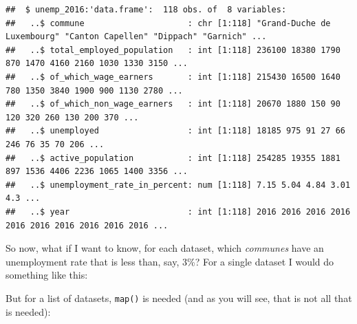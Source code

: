 \documentclass[]{gitbook}
\newenvironment{Shaded}{\begin{snugshade}}{\end{snugshade}}
\newcommand{\DecValTok}[1]{\textcolor[rgb]{0.00,0.00,0.81}{#1}}
\newcommand{\KeywordTok}[1]{\textcolor[rgb]{0.13,0.29,0.53}{\textbf{#1}}}
\newcommand{\NormalTok}[1]{#1}
\newcommand{\OperatorTok}[1]{\textcolor[rgb]{0.81,0.36,0.00}{\textbf{#1}}}
\newcommand{\StringTok}[1]{\textcolor[rgb]{0.31,0.60,0.02}{#1}}
\begin{document}
\begin{verbatim}
##  $ unemp_2016:'data.frame':  118 obs. of  8 variables:
##   ..$ commune                     : chr [1:118] "Grand-Duche de Luxembourg" "Canton Capellen" "Dippach" "Garnich" ...
##   ..$ total_employed_population   : int [1:118] 236100 18380 1790 870 1470 4160 2160 1030 1330 3150 ...
##   ..$ of_which_wage_earners       : int [1:118] 215430 16500 1640 780 1350 3840 1900 900 1130 2780 ...
##   ..$ of_which_non_wage_earners   : int [1:118] 20670 1880 150 90 120 320 260 130 200 370 ...
##   ..$ unemployed                  : int [1:118] 18185 975 91 27 66 246 76 35 70 206 ...
##   ..$ active_population           : int [1:118] 254285 19355 1881 897 1536 4406 2236 1065 1400 3356 ...
##   ..$ unemployment_rate_in_percent: num [1:118] 7.15 5.04 4.84 3.01 4.3 ...
##   ..$ year                        : int [1:118] 2016 2016 2016 2016 2016 2016 2016 2016 2016 2016 ...
\end{verbatim}

So now, what if I want to know, for each dataset, which \emph{communes} have an unemployment rate that is
less than, say, 3\%? For a single dataset I would do something like this:

\begin{Shaded}
\end{Shaded}

But for a list of datasets, \texttt{map()} is needed (and as you will see, that is not all that is needed):

\begin{Shaded}
\end{Shaded}
\end{document}
